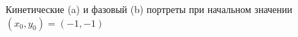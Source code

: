 \documentclass[11pt]{article}
\begin{document}
\begin{enumerate}
\begin{figure}[htbp!]
{\begin{minipage}[b]{.3\linewidth}
				\end{minipage}
			}
			\caption{Кинетические (a) и фазовый (b) портреты при начальном значении $(x_0,y_0)=(-1,-1)$}
		\end{figure}
		\begin{figure}[h!]
			\centering
\end{figure}
\end{enumerate}
\end{document}

